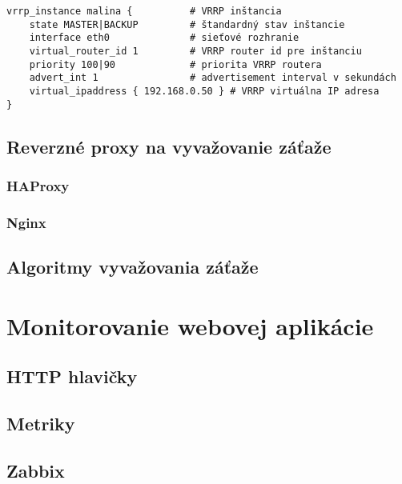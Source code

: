 \documentclass[12pt, a4paper]{article}
\begin{document}

\begin{lstlisting}
vrrp_instance malina {          # VRRP inštancia
    state MASTER|BACKUP         # štandardný stav inštancie
    interface eth0              # sieťové rozhranie
    virtual_router_id 1         # VRRP router id pre inštanciu
    priority 100|90             # priorita VRRP routera
    advert_int 1                # advertisement interval v sekundách
    virtual_ipaddress { 192.168.0.50 } # VRRP virtuálna IP adresa
}
\end{lstlisting}

\subsection{Reverzné proxy na vyvažovanie záťaže}
\subsubsection{HAProxy}

\subsubsection{Nginx}

\subsection{Algoritmy vyvažovania záťaže}


\section{Monitorovanie webovej aplikácie}

\subsection{HTTP hlavičky}

\subsection{Metriky}

\subsection{Zabbix}
\end{document}
